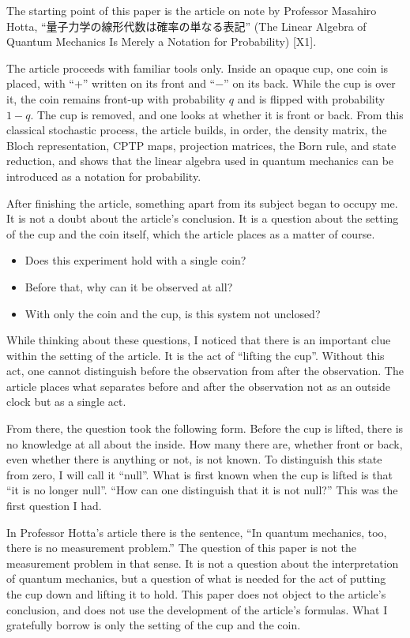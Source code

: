 \documentclass[
  a4paper,
]{article}
\providecommand{\tightlist}{%
  \setlength{\itemsep}{0pt}\setlength{\parskip}{0pt}}
\begin{document}
The starting point of this paper is the article on note by Professor
Masahiro Hotta, ``量子力学の線形代数は確率の単なる表記'' (The Linear
Algebra of Quantum Mechanics Is Merely a Notation for Probability)
{[}X1{]}.

The article proceeds with familiar tools only. Inside an opaque cup, one
coin is placed, with ``+'' written on its front and ``−'' on its back.
While the cup is over it, the coin remains front-up with probability
\(q\) and is flipped with probability \(1-q\). The cup is removed, and
one looks at whether it is front or back. From this classical stochastic
process, the article builds, in order, the density matrix, the Bloch
representation, CPTP maps, projection matrices, the Born rule, and state
reduction, and shows that the linear algebra used in quantum mechanics
can be introduced as a notation for probability.

After finishing the article, something apart from its subject began to
occupy me. It is not a doubt about the article's conclusion. It is a
question about the setting of the cup and the coin itself, which the
article places as a matter of course.

\begin{itemize}
\tightlist
\item
  Does this experiment hold with a single coin?
\item
  Before that, why can it be observed at all?
\item
  With only the coin and the cup, is this system not unclosed?
\end{itemize}

While thinking about these questions, I noticed that there is an
important clue within the setting of the article. It is the act of
``lifting the cup''. Without this act, one cannot distinguish before the
observation from after the observation. The article places what
separates before and after the observation not as an outside clock but
as a single act.

From there, the question took the following form. Before the cup is
lifted, there is no knowledge at all about the inside. How many there
are, whether front or back, even whether there is anything or not, is
not known. To distinguish this state from zero, I will call it ``null''.
What is first known when the cup is lifted is that ``it is no longer
null''. ``How can one distinguish that it is not null?'' This was the
first question I had.

In Professor Hotta's article there is the sentence, ``In quantum
mechanics, too, there is no measurement problem.'' The question of this
paper is not the measurement problem in that sense. It is not a question
about the interpretation of quantum mechanics, but a question of what is
needed for the act of putting the cup down and lifting it to hold. This
paper does not object to the article's conclusion, and does not use the
development of the article's formulas. What I gratefully borrow is only
the setting of the cup and the coin.
\end{document}

